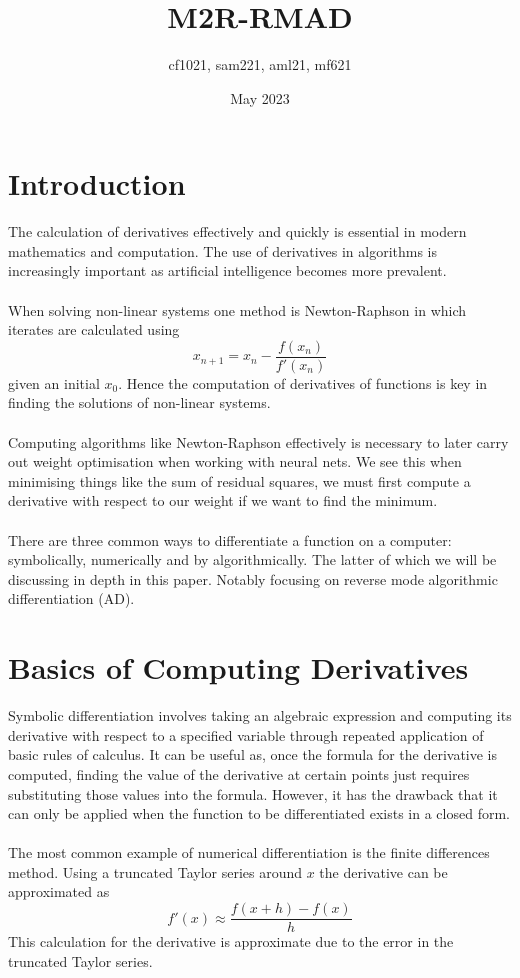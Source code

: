 \documentclass{article}
\title{M2R-RMAD}
\author{cf1021, sam221, aml21, mf621}
\date{May 2023}
\begin{document}
\maketitle
\tableofcontents
\newpage
\section{Introduction}

The calculation of derivatives effectively and quickly is essential in modern mathematics and computation. The use of derivatives in algorithms is increasingly important as artificial intelligence becomes more prevalent.
\\\\
When solving non-linear systems one method is Newton-Raphson in which iterates are calculated using
\begin{equation}
x_{n+1} = x_n - \frac{f(x_n)}{f'(x_n)}
\end{equation}
given an initial $x_0$. Hence the computation of derivatives of functions is key in finding the solutions of non-linear systems.
\\\\
Computing algorithms like Newton-Raphson effectively is necessary to later carry out weight optimisation when working with neural nets. We see this when minimising things like the sum of residual squares, we must first compute a derivative with respect to our weight if we want to find the minimum.
\\\\
There are three common ways to differentiate a function on a computer: symbolically, numerically and by algorithmically. The latter of which we will be discussing in depth in this paper. Notably focusing on reverse mode algorithmic differentiation (AD).

\section{Basics of Computing Derivatives}

Symbolic differentiation involves taking an algebraic expression and computing its derivative with respect to a specified variable through repeated application of basic rules of calculus. It can be useful as, once the formula for the derivative is computed, finding the value of the derivative at certain points just requires substituting those values into the formula. However, it has the drawback that it can only be applied when the function to be differentiated exists in a closed form. 
\\\\
The most common example of numerical differentiation is the finite differences method. Using a truncated Taylor series around $x$ the derivative can be approximated as
\begin{equation}
    f'(x) \approx \frac{f(x+h)-f(x)}{h}
\end{equation}
This calculation for the derivative is approximate due to the error in the truncated Taylor series.
\end{document}
